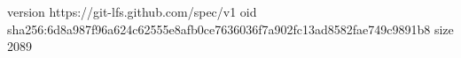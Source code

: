 version https://git-lfs.github.com/spec/v1
oid sha256:6d8a987f96a624c62555e8afb0ce7636036f7a902fc13ad8582fae749c9891b8
size 2089
